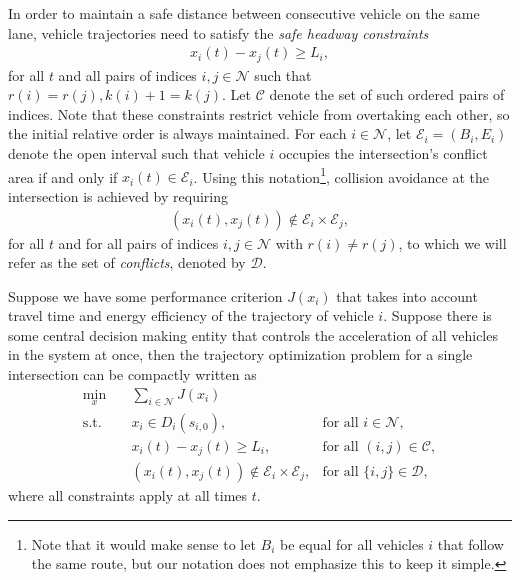 \documentclass[a4paper]{article}
\theoremstyle{definition}
\theoremstyle{plain}
\begin{document}
%
In order to maintain a safe distance between consecutive vehicle on the same
lane, vehicle trajectories need to satisfy the \textit{safe headway constraints}
\begin{align}
  \label{eq:follow_constraints}
  x_{i}(t) - x_{j}(t) \geq L_{i} ,
\end{align}
for all $t$ and all pairs of indices $i, j \in \mathcal{N}$ such that
$r(i) = r(j), k(i) + 1 = k(j)$. Let $\mathcal{C}$ denote the set of such ordered
pairs of indices. Note that these constraints restrict vehicle from overtaking
each other, so the initial relative order is always maintained.
%
For each $i \in \mathcal{N}$, let $\mathcal{E}_{i} = (B_{i}, E_{i})$ denote the
open interval such that vehicle $i$ occupies the intersection's conflict area if
and only if $x_{i}(t) \in \mathcal{E}_{i}$. Using this notation\footnote{Note
  that it would make sense to let $B_{i}$ be equal for all vehicles $i$ that
  follow the same route, but our notation does not emphasize this to keep it
  simple.}, collision avoidance at the intersection is achieved by requiring
\begin{align}
  \label{eq:conflict_constraints}
  (x_{i}(t), x_{j}(t)) \notin \mathcal{E}_{i} \times \mathcal{E}_{j} ,
\end{align}
for all $t$ and for all pairs of indices $i, j \in \mathcal{N}$ with
$r(i) \neq r(j)$, to which we will refer as the set of \textit{conflicts}, denoted
by $\mathcal{D}$.

Suppose we have some performance criterion $J(x_{i})$ that takes into account
travel time and energy efficiency of the trajectory of vehicle $i$. Suppose
there is some central decision making entity that controls the acceleration of
all vehicles in the system at once, then the trajectory optimization problem for
a single intersection can be compactly written as
\begin{subequations}
\label{eq:offline_single_intersection}
\begin{align}
  \min_{x} \quad & \sum_{i \in \mathcal{N}} J(x_{i}) \\
  \text{s.t.} \quad  & x_{i} \in D_{i}(s_{i,0}) , &\text{for all } i \in \mathcal{N} , \\
                & x_{i}(t) - x_{j}(t) \geq L_{i}, &\text{for all } (i,j) \in \mathcal{C} , \\
                & (x_{i}(t), x_{j}(t))  \notin \mathcal{E}_{i} \times \mathcal{E}_{j} , &\text{for all } \{i,j\} \in \mathcal{D} \label{eq:collision_constraints} ,
\end{align}
\end{subequations}
where all constraints apply at all times $t$.
\end{document}
